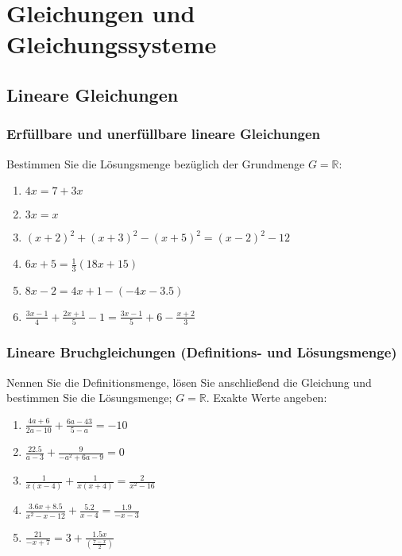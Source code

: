 


\section{Gleichungen und Gleichungssysteme}
\subsection{Lineare Gleichungen}

\subsubsection{Erfüllbare und unerfüllbare lineare Gleichungen}

Bestimmen Sie die Lösungsmenge bezüglich der Grundmenge
$G=\mathbb{R}$:

\begin{enumerate}[label=\alph*)]
\item $4x=7+3x$
\item $3x=x$
\item $(x+2)^2 + (x+3)^2 - (x+5)^2 = (x-2)^2 - 12$
\item $6x + 5 = \frac{1}{3} (18x + 15)$
\item $8x -2 = 4x + 1 - (-4x - 3.5)$
\item $\frac{3x-1}{4} + \frac{2x+1}{5} - 1 = \frac{3x-1}{5} +6 - \frac{x+2}{3}$
\end{enumerate}

\subsubsection{Lineare Bruchgleichungen (Definitions- und
  Lösungsmenge)}

Nennen Sie die Definitionsmenge, lösen Sie anschließend die Gleichung
und bestimmen Sie die Lösungsmenge; $G=\mathbb{R}$. Exakte Werte
angeben:

\begin{multicols}{2}
\begin{enumerate}[label=\alph*)]
\item $\frac{4a+6}{2a-10} + \frac{6a-43}{5-a} = -10$
\item $\frac{22.5}{a-3} + \frac{9}{-a^2 + 6a - 9} = 0$
\item $\frac{1}{x(x-4)} + \frac{1}{x(x+4)} = \frac{2}{x^2-16}$
\item $\frac{3.6x+8.5}{x^2-x-12} + \frac{5.2}{x-4} = \frac{1.9}{-x-3}$
\item $\frac{21}{-x+7} = 3 + \frac{1.5x}{\left(\frac{7-x}{2}\right)}$    
\end{enumerate}
\end{multicols}

